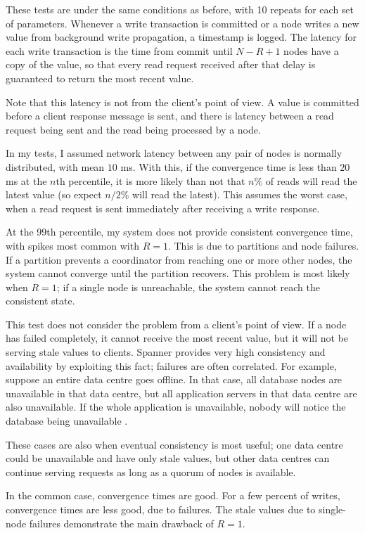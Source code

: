\documentclass[12pt,a4paper,twoside,openany]{report}
\begin{document}
These tests are under the same conditions as before, with 10 repeats for each set of parameters. Whenever a write transaction is committed or a node writes a new value from background write propagation, a timestamp is logged. The latency for each write transaction is the time from commit until $N - R + 1$ nodes have a copy of the value, so that every read request received after that delay is guaranteed to return the most recent value.

Note that this latency is not from the client's point of view. A value is committed before a client response message is sent, and there is latency between a read request being sent and the read being processed by a node.

In my tests, I assumed network latency between any pair of nodes is normally distributed, with mean $10$ ms. With this, if the convergence time is less than $20$ ms at the $n$th percentile, it is more likely than not that $n\%$ of reads will read the latest value (so expect $n / 2 \%$ will read the latest). This assumes the worst case, when a read request is sent immediately after receiving a write response.

At the 99th percentile, my system does not provide consistent convergence time, with spikes most common with $R = 1$. This is due to partitions and node failures. If a partition prevents a coordinator from reaching one or more other nodes, the system cannot converge until the partition recovers. This problem is most likely when $R = 1$; if a single node is unreachable, the system cannot reach the consistent state.

This test does not consider the problem from a client's point of view. If a node has failed completely, it cannot receive the most recent value, but it will not be serving stale values to clients. Spanner provides very high consistency and availability by exploiting this fact; failures are often correlated. For example, suppose an entire data centre goes offline. In that case, all database nodes are unavailable in that data centre, but all application servers in that data centre are also unavailable. If the whole application is unavailable, nobody will notice the database being unavailable \cite{45855}.

These cases are also when eventual consistency is most useful; one data centre could be unavailable and have only stale values, but other data centres can continue serving requests as long as a quorum of nodes is available.

In the common case, convergence times are good. For a few percent of writes, convergence times are less good, due to failures. The stale values due to single-node failures demonstrate the main drawback of $R = 1$.
\end{document}
